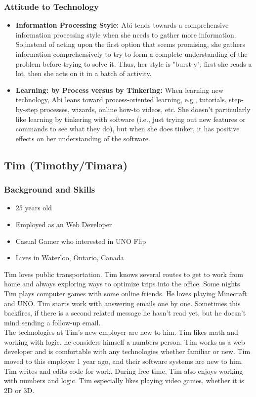 \documentclass[12pt, titlepage]{article}
\begin{document}
\subsubsection{Attitude to Technology}
\begin{itemize}
    \item \textbf{Information Processing Style:} Abi tends towards a comprehensive information processing style when she needs to gather more information. So,instead of acting upon the first option that seems promising, she gathers information comprehensively to try to form a complete understanding of the problem before trying to solve it. Thus, her style is "burst-y"; first she reads a lot, then she acts on it in a batch of activity.
    \item \textbf{Learning: by Process versus by Tinkering:} When learning new technology, Abi leans toward process-oriented learning, e.g., tutorials, step-by-step processes, wizards, online how-to videos, etc. She doesn't particularly like learning by tinkering with software (i.e., just trying out new features or commands to see what they do), but when she does tinker, it has positive effects on her understanding of the software.
\end{itemize}

\subsection{Tim (Timothy/Timara)}
\subsubsection{Background and Skills}
\begin{itemize}
    \item 25 years old
    \item Employed as an Web Developer
    \item Casual Gamer who interested in UNO Flip
    \item Lives in Waterloo, Ontario, Canada
\end{itemize}
Tim loves public transportation. Tim knows several routes to get to work from home and always exploring ways to optimize trips into the office. Some nights Tim plays computer games with some online friends. He loves playing Minecraft and UNO. Tim starts work with answering emails one by one. Sometimes this backfires, if there is a second related message he hasn't read yet, but he doesn't mind sending a follow-up email.\\
The technologies at Tim's new employer are new to him. Tim likes math and working with logic. he considers himself a numbers person. Tim works as a web developer and is comfortable with any technologies whether familiar or new. Tim moved to this employer 1 year ago, and their software systems are new to him. Tim writes and edits code for work. During free time, Tim also enjoys working with numbers and logic. Tim especially likes playing video games, whether it is 2D or 3D.
\end{document}
